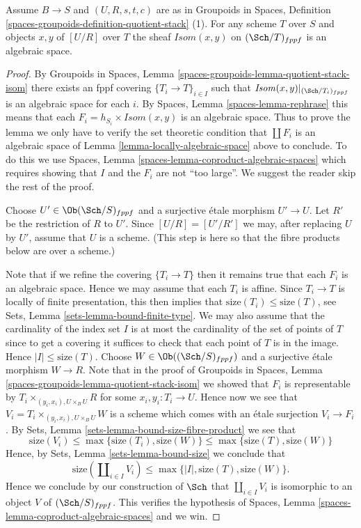 \begin{lemma}
\label{lemma-quotient-stack-isom}
Assume $B \to S$ and $(U, R, s, t, c)$ are as in
Groupoids in Spaces,
Definition \ref{spaces-groupoids-definition-quotient-stack} (1).
For any scheme $T$ over $S$ and objects $x, y$ of $[U/R]$ over $T$
the sheaf $\mathit{Isom}(x, y)$ on $(\Sch/T)_{fppf}$
is an algebraic space.
\end{lemma}

\begin{proof}
By
Groupoids in Spaces,
Lemma \ref{spaces-groupoids-lemma-quotient-stack-isom}
there exists an fppf covering $\{T_i \to T\}_{i \in I}$
such that $\mathit{Isom}(x, y)|_{(\Sch/T_i)_{fppf}}$
is an algebraic space for each $i$. By
Spaces, Lemma \ref{spaces-lemma-rephrase}
this means that each $F_i = h_{S_i} \times \mathit{Isom}(x, y)$
is an algebraic space.
Thus to prove the lemma we only have to verify the set theoretic condition
that $\coprod F_i$ is an algebraic space of
Lemma \ref{lemma-locally-algebraic-space}
above to conclude. To do this we use
Spaces, Lemma \ref{spaces-lemma-coproduct-algebraic-spaces}
which requires showing that $I$ and the $F_i$ are not ``too large''.
We suggest the reader skip the rest of the proof.

\medskip\noindent
Choose $U' \in \Ob(\Sch/S)_{fppf}$ and a surjective
\'etale morphism $U' \to U$. Let $R'$ be the restriction of $R$ to $U'$.
Since $[U/R] = [U'/R']$ we may, after replacing $U$ by $U'$,
assume that $U$ is a scheme. (This step is here so that the
fibre products below are over a scheme.)

\medskip\noindent
Note that if we refine the covering $\{T_i \to T\}$ then it remains
true that each $F_i$ is an algebraic space.
Hence we may assume that each $T_i$ is affine. Since
$T_i \to T$ is locally of finite presentation, this then implies that
$\text{size}(T_i) \leq \text{size}(T)$, see
Sets, Lemma \ref{sets-lemma-bound-finite-type}.
We may also assume that the cardinality of the index set $I$ is at most the
cardinality of the set of points of $T$ since to get a
covering it suffices to check that each point of $T$ is in the image.
Hence $|I| \leq \text{size}(T)$.
Choose $W \in \Ob((\Sch/S)_{fppf})$
and a surjective \'etale morphism $W \to R$. Note that in the proof of
Groupoids in Spaces,
Lemma \ref{spaces-groupoids-lemma-quotient-stack-isom}
we showed that $F_i$ is representable by
$T_i \times_{(y_i, x_i), U \times_B U} R$ for some
$x_i, y_i : T_i \to U$. Hence now we see that
$V_i = T_i \times_{(y_i, x_i), U \times_B U} W$ is a
scheme which comes with an \'etale surjection $V_i \to F_i$.
By
Sets, Lemma \ref{sets-lemma-bound-size-fibre-product}
we see that
$$
\text{size}(V_i) \leq \max\{\text{size}(T_i), \text{size}(W)\}
\leq \max\{\text{size}(T), \text{size}(W)\}
$$
Hence, by
Sets, Lemma \ref{sets-lemma-bound-size}
we conclude that
$$
\text{size}(\coprod\nolimits_{i \in I} V_i)
\leq \max\{|I|, \text{size}(T), \text{size}(W)\}.
$$
Hence we conclude by our construction of $\Sch$
that $\coprod_{i \in I} V_i$ is isomorphic to an object
$V$ of $(\Sch/S)_{fppf}$. This verifies the
hypothesis of
Spaces, Lemma \ref{spaces-lemma-coproduct-algebraic-spaces}
and we win.
\end{proof}

